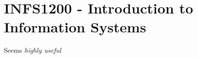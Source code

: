 \hypertarget{INFS1200}{\section{INFS1200 - Introduction to Information Systems}}
Seems \textit{highly useful}
